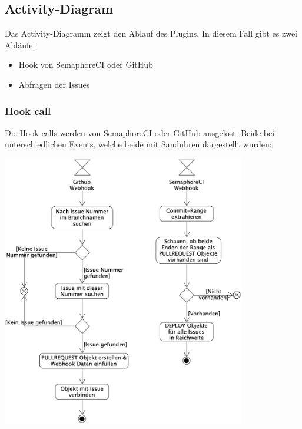 \begin{minipage}{\textwidth}
  \subsection{Activity-Diagram}
  \label{sec:activity_diagram}
  Das Activity-Diagramm zeigt den Ablauf des Plugins. In diesem Fall gibt es zwei Abläufe:
  \begin{itemize}
    \item Hook von SemaphoreCI oder GitHub
    \item Abfragen der Issues \newline
  \end{itemize}
\end{minipage}

\begin{minipage}{\textwidth}
  \subsubsection{Hook call}
  Die Hook calls werden von SemaphoreCI oder GitHub ausgelöst. Beide bei unterschiedlichen Events, welche beide mit Sanduhren
  dargestellt wurden:
  \begin{center}
    \includegraphics[width=0.8\textwidth]{images/activity/webhook.png}
    \label{fig:activity_hook_call}
  \end{center}
\end{minipage}

